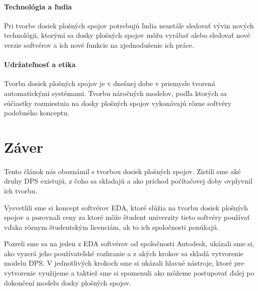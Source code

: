 \documentclass[12pt,slovak,a4paper, twocolumn]{article}
\begin{document}
\paragraph{Technológia a ľudia} 
Pri tvorbe dosiek plošných spojov potrebujú ľudia neustále sledovať vývin nových technológii, ktorými sa dosky plošných spojov môžu vyrábať alebo sledovať nové verzie softvérov a ich nové funkcie na zjednodušenie ich práce.
\paragraph{Udržateľnosť a etika}
Tvorba dosiek plošných spojov je v dnešnej dobe v priemysle tvorená automatickými systémami. Tvorbu náročných modelov, podľa ktorých sa súčiastky rozmiestnia na dosky plošných spojov vykonávajú rôzne softvéry podobného konceptu.

\section{Záver} \label{zaver}
\paragraph{} Tento článok nás oboznámil s tvorbou dosiek plošných spojov. Zistili sme aké druhy DPS existujú, z čoho sa skladajú a ako príchod počítačovej doby ovplyvnil ich tvorbu. \newline
\par Vysvetlili sme si koncept softvérov EDA, ktoré slúžia na tvorbu dosiek plošných spojov a porovnali ceny za ktoré môže študent univerzity tieto softvéry používať vďaka rôznym študentským licenciám, ak to ich spoločnosti ponúkajú. \newline
\par Pozreli sme sa na jeden z EDA softvérov od spoločnosti Autodesk, ukázali sme si, ako vyzerá jeho používateľské rozhranie a z akých krokov sa skladá vytvorenie modelu DPS. V jednotlivých krokoch sme si ukázali hlavné nástroje, ktoré pre vytvorenie využijeme a taktiež sme si spomenuli ako môžeme postupovať ďalej po dokončení modelu dosky plošných spojov. 


\end{document}
